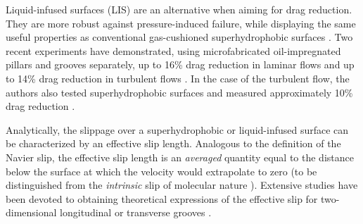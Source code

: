 Liquid-infused surfaces (LIS) are an alternative when aiming for drag reduction. They are more robust against pressure-induced failure, while displaying the same useful properties as conventional gas-cushioned superhydrophobic surfaces \citep{Wexler}. Two recent experiments have demonstrated, using microfabricated oil-impregnated pillars and grooves separately, up to 16\% drag reduction in laminar flows \citep{Solomon} and up to 14\% drag reduction in turbulent flows \citep{Rosenberg}. In the case of the turbulent flow, the authors also tested superhydrophobic surfaces and measured approximately 10\% drag reduction \citep{Rosenberg}.

Analytically, the slippage over a superhydrophobic or liquid-infused surface can be characterized by an effective slip length. Analogous to the definition of the Navier slip, the effective slip length is an \textit{averaged} quantity equal to the distance below the surface at which the velocity would extrapolate to zero (to be distinguished from the \textit{intrinsic} slip of molecular nature \citep{Gentili}). Extensive studies have been devoted to obtaining theoretical expressions of the effective slip for two-dimensional longitudinal or transverse grooves \citep{Lauga_Stone, Sbragalia_Prosperetti, Davis_Lauga, Ng_Wang, Schonecker, Nizkaya, Crowdy_long, Crowdy_tran}.

